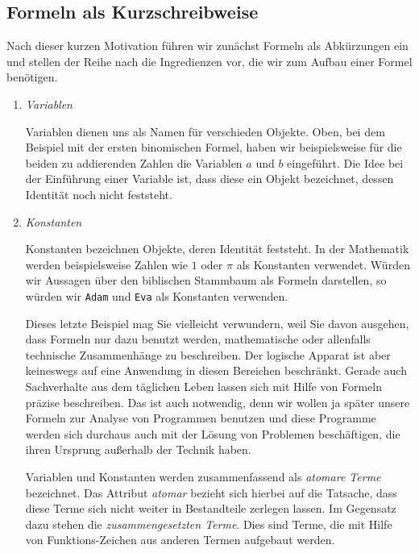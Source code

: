 \subsection{Formeln als Kurzschreibweise}
Nach dieser kurzen Motivation f\"{u}hren wir zun\"{a}chst Formeln als Abk\"{u}rzungen ein und stellen
der Reihe nach die Ingredienzen vor, die wir zum Aufbau einer Formel ben\"{o}tigen. 
\begin{enumerate}
\item \emph{Variablen}

      Variablen dienen uns als Namen f\"{u}r verschieden Objekte.  Oben, bei dem Beispiel mit
      der ersten binomischen Formel, haben wir beispielsweise 
      f\"{u}r die beiden zu addierenden Zahlen die Variablen $a$ und $b$ eingef\"{u}hrt.  Die Idee bei
      der Einf\"{u}hrung einer Variable ist, dass diese ein Objekt bezeichnet, dessen Identit\"{a}t 
      noch nicht feststeht.
\item \emph{Konstanten}

      Konstanten bezeichnen  Objekte, deren Identit\"{a}t feststeht. 
      In der Mathematik werden beispielsweise Zahlen wie $1$ oder $\pi$ als Konstanten verwendet.
      W\"{u}rden wir Aussagen \"{u}ber den biblischen Stammbaum als Formeln darstellen, so w\"{u}rden
      wir  \texttt{Adam} und \texttt{Eva} als Konstanten verwenden.

      \begin{center}
      \begin{minipage}{13.4cm}  
        { \footnotesize
          \setlength{\baselineskip}{9pt} 
          Dieses letzte Beispiel mag Sie vielleicht verwundern, weil Sie davon
          ausgehen, dass Formeln nur dazu benutzt werden, mathematische oder allenfalls
          technische Zusammenh\"{a}nge zu beschreiben.  Der logische Apparat ist aber
          keineswegs auf eine Anwendung in diesen Bereichen beschr\"{a}nkt.  Gerade auch
          Sachverhalte aus dem t\"{a}glichen Leben lassen sich mit Hilfe von Formeln pr\"{a}zise
          beschreiben.  Das ist auch notwendig, denn wir wollen ja sp\"{a}ter unsere Formeln
          zur Analyse von Programmen benutzen und diese Programme werden sich durchaus
          auch mit der L\"{o}sung von Problemen besch\"{a}ftigen, die ihren Ursprung außerhalb der
          Technik haben. \par} 
      \end{minipage}
      \end{center}

      Variablen und Konstanten werden zusammenfassend als \emph{atomare Terme}
      bezeichnet.  Das Attribut \emph{atomar} bezieht sich hierbei auf die Tatsache,
      dass diese Terme sich nicht weiter in Bestandteile zerlegen lassen.  Im Gegensatz
      dazu stehen die \emph{zusammengesetzten Terme}.  Dies sind Terme, die mit Hilfe von 
      Funktions-Zeichen aus anderen Termen aufgebaut werden.


\end{enumerate}
